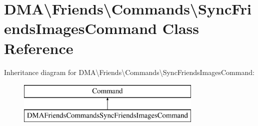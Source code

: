 \hypertarget{classDMA_1_1Friends_1_1Commands_1_1SyncFriendsImagesCommand}{}\section{D\+M\+A\textbackslash{}Friends\textbackslash{}Commands\textbackslash{}Sync\+Friends\+Images\+Command Class Reference}
\label{classDMA_1_1Friends_1_1Commands_1_1SyncFriendsImagesCommand}
Inheritance diagram for D\+M\+A\textbackslash{}Friends\textbackslash{}Commands\textbackslash{}Sync\+Friends\+Images\+Command\+:\begin{figure}[H]
\begin{center}
\leavevmode
\includegraphics[height=2.000000cm]{d0/da8/classDMA_1_1Friends_1_1Commands_1_1SyncFriendsImagesCommand}
\end{center}
\end{figure}
